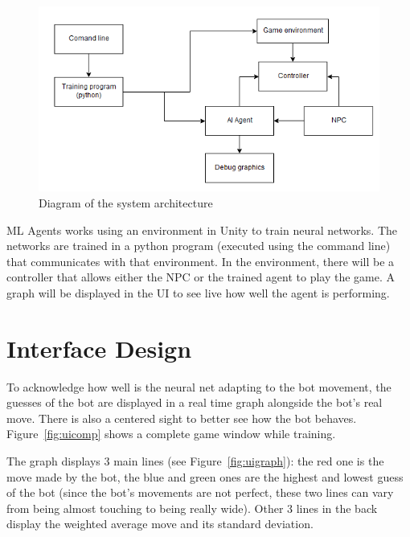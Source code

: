 \begin{figure}[h]
  \centering
		\includegraphics[width=.8\textwidth]{img/systemArchitecture.png}
  \caption{Diagram of the system architecture}
  \label{fig:architecture}
\end{figure}

ML Agents works using an environment in Unity to train neural networks. The networks are trained in a python program (executed using the command line) that communicates with that environment. In the environment, there will be a controller that allows either the NPC or the trained agent to play the game. A graph will be displayed in the UI to see live how well the agent is performing.

\section{Interface Design}

To acknowledge how well is the neural net adapting to the bot movement, the guesses of the bot are displayed in a real time graph alongside the bot's real move. There is also a centered sight to better see how the bot behaves. Figure~\ref{fig:uicomp} shows a complete game window while training.

The graph displays 3 main lines (see Figure~\ref{fig:uigraph}): the red one is the move made by the bot, the blue and green ones are the highest and lowest guess of the bot (since the bot's movements are not perfect, these two lines can vary from being almost touching to being really wide). Other 3 lines in the back display the weighted average move and its standard deviation.

